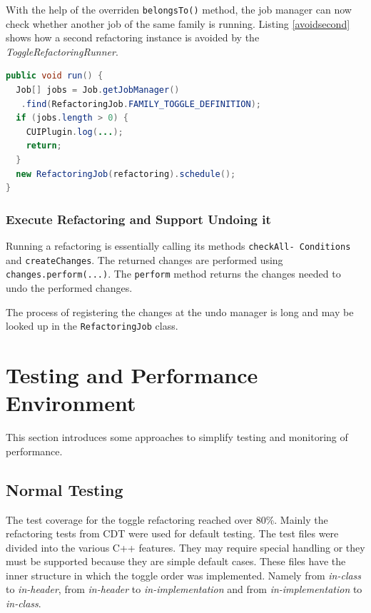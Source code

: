 With the help of the overriden \texttt{belongsTo()} method, the job manager can 
now check whether another job of the same family is running. Listing 
\ref{avoidsecond} shows how a second refactoring instance is avoided by the 
\textit{ToggleRefactoringRunner}.

\begin{lstlisting}[caption={ToggleRefactoringRunner avoiding a second refactoring instance},
label={avoidsecond}, language=Java]
public void run() {
  Job[] jobs = Job.getJobManager()
   .find(RefactoringJob.FAMILY_TOGGLE_DEFINITION);
  if (jobs.length > 0) {
    CUIPlugin.log(...);
    return;
  }
  new RefactoringJob(refactoring).schedule();
}
\end{lstlisting}


\subsubsection{Execute Refactoring and Support Undoing it}
Running a refactoring is essentially calling its methods 
\texttt{checkAll- Conditions} and \texttt{createChanges}. The returned 
changes are performed using \texttt{changes.perform(...)}. The 
\texttt{perform} method returns the changes needed to undo the performed 
changes.

The process of registering the changes at the undo manager is long and may be 
looked up in the \texttt{RefactoringJob} class.

\section{Testing and Performance Environment}

This section introduces some approaches to simplify testing and monitoring of 
performance.

\subsection{Normal Testing}

The test coverage for the toggle refactoring reached over 80\%. Main\-ly the
refactoring tests from CDT were used for default testing. The test files were
divided into the various C++ features. They may require special handling or they
must be supported because they are simple default cases. These files have the
inner structure in which the toggle order was implemented. Namely from
\textit{in-class} to \textit{in-header}, from \textit{in-header} to
\textit{in-implementation} and from \textit{in-implementation} to
\textit{in-class}.

